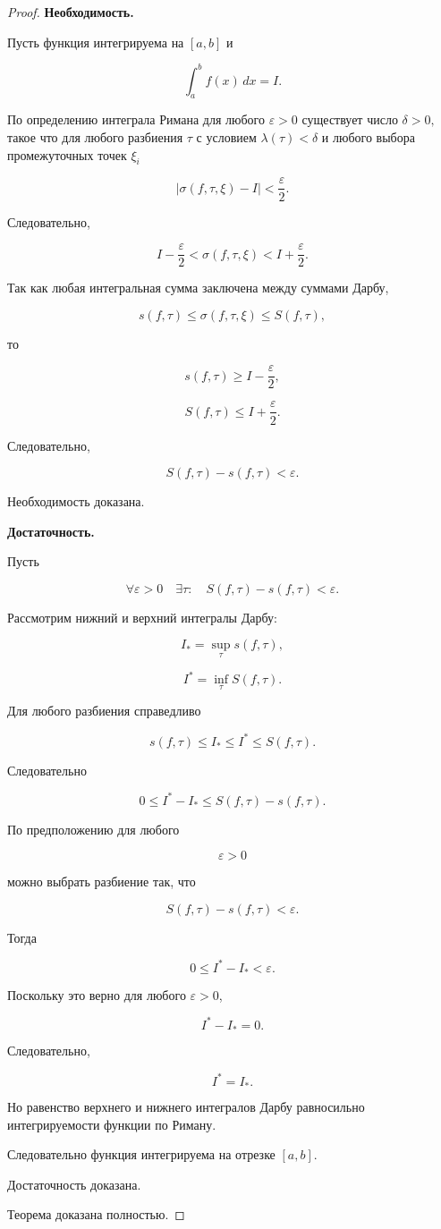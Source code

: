 \documentclass[14pt]{extreport}
\begin{document}
\begin{proof}

\textbf{Необходимость.}

Пусть функция интегрируема на $[a,b]$ и

\[
\int_a^b f(x)\,dx=I.
\]

По определению интеграла Римана для любого
$
\varepsilon>0
$
существует число
$
\delta>0,
$
такое что для любого разбиения $\tau$ с условием
$
\lambda(\tau)<\delta
$
и любого выбора промежуточных точек $\xi_i$

\[
\left|
\sigma(f,\tau,\xi)-I
\right|
<
\frac{\varepsilon}{2}.
\]

Следовательно,

\[
I-\frac{\varepsilon}{2}
<
\sigma(f,\tau,\xi)
<
I+\frac{\varepsilon}{2}.
\]

Так как любая интегральная сумма заключена между суммами Дарбу,

\[
s(f,\tau)
\le
\sigma(f,\tau,\xi)
\le
S(f,\tau),
\]

то

\[
s(f,\tau)
\ge
I-\frac{\varepsilon}{2},
\]

\[
S(f,\tau)
\le
I+\frac{\varepsilon}{2}.
\]

Следовательно,

\[
S(f,\tau)-s(f,\tau)
<
\varepsilon.
\]

Необходимость доказана.

\bigskip

\textbf{Достаточность.}

Пусть

\[
\forall \varepsilon>0
\quad
\exists \tau:
\quad
S(f,\tau)-s(f,\tau)<\varepsilon.
\]

Рассмотрим нижний и верхний интегралы Дарбу:

\[
I_*=
\sup_{\tau}s(f,\tau),
\]

\[
I^*=
\inf_{\tau}S(f,\tau).
\]

Для любого разбиения справедливо

\[
s(f,\tau)
\le
I_*
\le
I^*
\le
S(f,\tau).
\]

Следовательно

\[
0
\le
I^*-I_*
\le
S(f,\tau)-s(f,\tau).
\]

По предположению для любого

\[
\varepsilon>0
\]

можно выбрать разбиение так, что

\[
S(f,\tau)-s(f,\tau)<\varepsilon.
\]

Тогда

\[
0
\le
I^*-I_*
<
\varepsilon.
\]

Поскольку это верно для любого $\varepsilon>0$,

\[
I^*-I_*=0.
\]

Следовательно,

\[
I^*=I_*.
\]

Но равенство верхнего и нижнего интегралов Дарбу
равносильно интегрируемости функции по Риману.

Следовательно функция интегрируема на отрезке $[a,b]$.

Достаточность доказана.

Теорема доказана полностью.
\end{proof}
\end{document}
